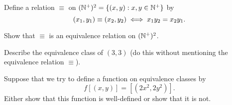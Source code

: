 \begin{problem}
  Define a relation $\equiv$ on $(\mathbb{N}^+)^2 = \left\{(x, y) : x, y \in \mathbb{N}^+\right\}$ by
  \[ (x_1, y_1) \equiv (x_2, y_2) \;\Longleftrightarrow\; x_1y_2 = x_2y_1. \]
  \begin{enumalph}
    \item Show that $\equiv$ is an equivalence relation on $(\mathbb{N}^+)^2$.
    \item Describe the equivalence class of $(3, 3)$
      (do this without mentioning the equivalence relation $\equiv$).
    \item Suppose that we try to define a function on equivalence classes by
      \[ f[(x, y)] = [(2x^2, 2y^2)]. \]
      Either show that this function is well-defined or show that it is not.
  \end{enumalph}
\end{problem}
